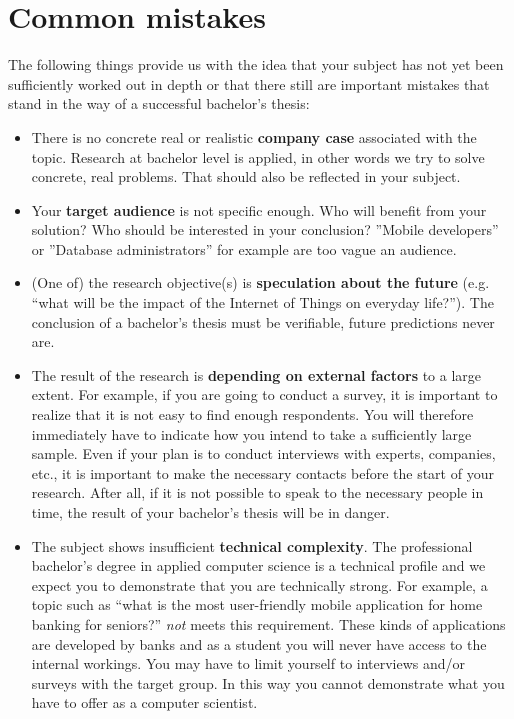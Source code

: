 \section{Common mistakes}
\label{sec:subjectcommonmistakes}

The following things provide us with the idea that your subject has not yet been sufficiently worked out in depth or that there still are important mistakes that stand in the way of a successful bachelor's thesis:

\begin{itemize}
  \item There is no concrete real or realistic \textbf{company case} associated with the topic. Research at bachelor level is applied, in other words we try to solve concrete, real problems. That should also be reflected in your subject.
  \item Your \textbf{target audience} is not specific enough. Who will benefit from your solution? Who should be interested in your conclusion? ''Mobile developers'' or ''Database administrators'' for example are too vague an audience.
  \item (One of) the research objective(s) is \textbf{speculation about the future} (e.g.  ``what will be the impact of the Internet of Things on everyday life?''). The conclusion of a bachelor's thesis must be verifiable, future predictions never are.
  \item The result of the research is \textbf{depending on external factors} to a large extent. For example, if you are going to conduct a survey, it is important to realize that it is not easy to find enough respondents. You will therefore immediately have to indicate how you intend to take a sufficiently large sample. Even if your plan is to conduct interviews with experts, companies, etc., it is important to make the necessary contacts before the start of your research. After all, if it is not possible to speak to the necessary people in time, the result of your bachelor's thesis will be in danger.
  \item The subject shows insufficient \textbf{technical complexity}. The professional bachelor's degree in applied computer science is a technical profile and we expect you to demonstrate that you are technically strong. For example, a topic such as ``what is the most user-friendly mobile application for home banking for seniors?'' \textit{not} meets this requirement. These kinds of applications are developed by banks and as a student you will never have access to the internal workings. You may have to limit yourself to interviews and/or surveys with the target group. In this way you cannot demonstrate what you have to offer as a computer scientist.

\end{itemize}
